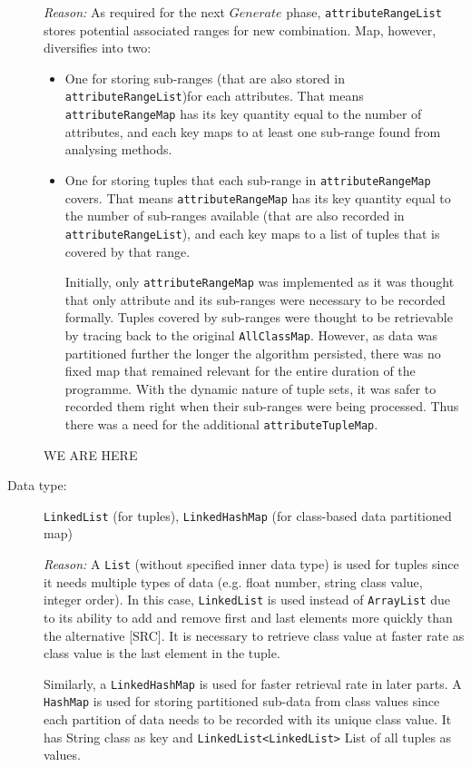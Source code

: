\begin{description}
\textit{Reason: } As required for the next $Generate$ phase, \texttt{attributeRangeList} stores potential associated ranges for new combination. 
Map, however, diversifies into two: 
\begin{itemize}
	\item One for storing sub-ranges (that are also stored in \texttt{attributeRangeList})for each attributes. That means \texttt{attributeRangeMap} has its key quantity equal to the number of attributes, and each key maps to at least one sub-range found from analysing methods.
	
	\item One for storing tuples that each sub-range in \texttt{attributeRangeMap} covers. That means \texttt{attributeRangeMap} has its key quantity equal to the number of sub-ranges available (that are also recorded in \texttt{attributeRangeList}), and each key maps to a list of tuples that is covered by that range.
	
	Initially, only \texttt{attributeRangeMap} was implemented as it was thought that only attribute and its sub-ranges were necessary to be recorded formally. Tuples covered by sub-ranges were thought to be retrievable by tracing back to the original \texttt{AllClassMap}.
	However, as data was partitioned further the longer the algorithm persisted, there was no fixed map that remained relevant for the entire duration of the programme. With the dynamic nature of tuple sets, it was safer to recorded them right when their sub-ranges were being processed. Thus there was a need for the additional \texttt{attributeTupleMap}.
\end{itemize}

WE ARE HERE 

\item[Data type: ] \texttt{LinkedList} (for tuples), \texttt{LinkedHashMap} (for class-based data partitioned map)

\textit{Reason: } A \texttt{List} (without specified inner data type) is used for tuples since it needs multiple types of data (e.g. float number, string class value, integer order). In this case, \texttt{LinkedList} is used instead of \texttt{ArrayList} due to its ability to add and remove first and last elements more quickly than the alternative [SRC]. It is necessary to retrieve class value at faster rate as class value is the last element in the tuple.

Similarly, a \texttt{LinkedHashMap} is used for faster retrieval rate in later parts. A \texttt{HashMap} is used for storing partitioned sub-data from class values since each partition of data needs to be recorded with its unique class value. It has String class as key and \texttt{LinkedList<LinkedList>} List of all tuples as values. 


\end{description}
